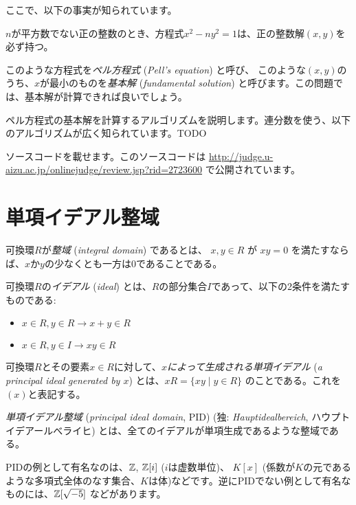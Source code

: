 \documentclass{jsarticle}
\begin{document}
 ここで、以下の事実が知られています。
 \begin{theorem}
  \label{thm:pells-equation-has-solutions}
  $n$が平方数でない正の整数のとき、方程式$x^2 - ny^2=1$は、正の整数解$(x,y)$を必ず持つ。
 \end{theorem}
 このような方程式を\emph{ペル方程式} (\emph{Pell's equation}) と呼び、
 このような$(x,y)$のうち、$x$が最小のものを\emph{基本解} (\emph{fundamental solution}) と呼びます。この問題では、基本解が計算できれば良いでしょう。

 ペル方程式の基本解を計算するアルゴリズムを説明します。連分数を使う、以下のアルゴリズムが広く知られています。TODO

 ソースコードを載せます。このソースコードは \url{http://judge.u-aizu.ac.jp/onlinejudge/review.jsp?rid=2723600} で公開されています。
 
 \section{単項イデアル整域}
 \label{sec:principal-ideal-domain}
 \begin{definition}
  可換環$R$が\emph{整域} (\emph{integral domain}) であるとは、
  $x, y\in R$ が $xy = 0$ を満たすならば、$x$か$y$の少なくとも一方は$0$であることである。
 \end{definition}
 \begin{definition}
  可換環$R$の\emph{イデアル} (\emph{ideal}) とは、$R$の部分集合$I$であって、以下の2条件を満たすものである:
  \begin{itemize}
   \item $x \in R, y \in R \to x + y \in R$
   \item $x \in R, y \in I \to xy \in R$
  \end{itemize}
 \end{definition}
 \begin{definition}
  可換環$R$とその要素$x \in R$に対して、$x$\emph{によって生成される単項イデアル} (\emph{a principal ideal generated by $x$}) とは、$xR = \{ xy \mid y \in R\}$ のことである。これを$(x)$と表記する。
 \end{definition}
 \begin{definition}
  \emph{単項イデアル整域} (\emph{principal ideal domain}, PID) (独: \emph{Hauptidealbereich}, ハウプトイデアールべライヒ) とは、全てのイデアルが単項生成であるような整域である。
 \end{definition}
 \begin{example}
  PIDの例として有名なのは、$\mathbb{Z}$, $\mathbb{Z}[i]$ ($i$は虚数単位)、 $K[x]$ (係数が$K$の元であるような多項式全体のなす集合、$K$は体)などです。逆にPIDでない例として有名なものには、$\mathbb{Z}[\sqrt{-5}]$ などがあります。
 \end{example}
\end{document}
